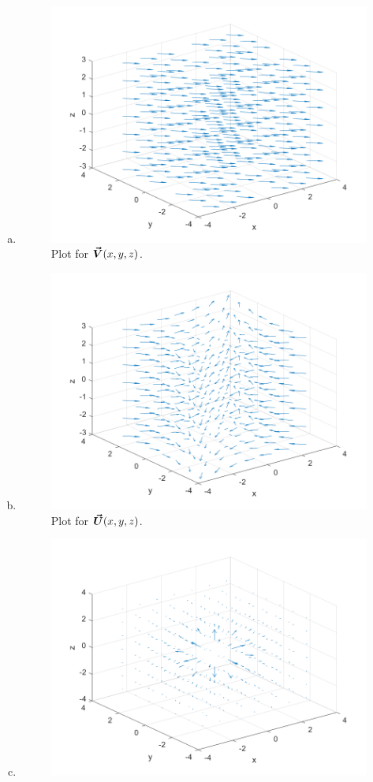 \documentclass[12pt]{article} %
\begin{document}
\begin{solution}~
\begin{enumerate}[(a)]
    \item 
    \begin{figure}[H]
        \centering
        \includegraphics[width=.6\textwidth]{Figures/const_wind.png}
        \caption{Plot for $\boldsymbol{\vec{V}}(x,y,z)$.}
    \end{figure}
    \item 
    \begin{figure}[H]
        \centering
        \includegraphics[width=.6\textwidth]{Figures/wind_fronts.png}
        \caption{Plot for $\boldsymbol{\vec{U}}(x,y,z)$.}
    \end{figure}
    \item 
    \begin{figure}[H]
        \centering
        \includegraphics[width=.6\textwidth]{Figures/source.png}

\end{figure}
\end{enumerate}
\end{solution}
\end{document}
